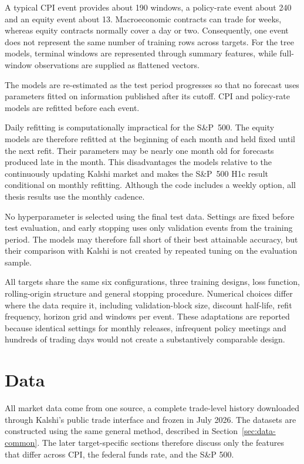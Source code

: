 \documentclass[12pt,a4paper]{report}
\begin{document}
A typical CPI event provides about 190 windows, a policy-rate event about 240
and an equity event about 13. Macroeconomic contracts can trade for weeks,
whereas equity contracts normally cover a day or two. Consequently, one event
does not represent the same number of training rows across targets. For the
tree models, terminal windows are represented through summary features, while
full-window observations are supplied as flattened vectors.

The models are re-estimated as the test period progresses so that no forecast
uses parameters fitted on information published after its cutoff. CPI and
policy-rate models are refitted before each event.

Daily refitting is computationally impractical for the S\&P~500. The equity
models are therefore refitted at the beginning of each month and held fixed
until the next refit. Their parameters may be nearly one month old for forecasts
produced late in the month. This disadvantages the models relative to the
continuously updating Kalshi market and makes the S\&P~500 H1c result
conditional on monthly refitting. Although the code includes a weekly option,
all thesis results use the monthly cadence.

No hyperparameter is selected using the final test data. Settings are fixed
before test evaluation, and early stopping uses only validation events from the
training period. The models may therefore fall short of their best attainable
accuracy, but their comparison with Kalshi is not created by repeated tuning on
the evaluation sample.

All targets share the same six configurations, three training designs, loss
function, rolling-origin structure and general stopping procedure. Numerical
choices differ where the data require it, including validation-block size,
discount half-life, refit frequency, horizon grid and windows per event. These
adaptations are reported because identical settings for monthly releases,
infrequent policy meetings and hundreds of trading days would not create a
substantively comparable design.

\chapter{Data}
\label{ch:data}

All market data come from one source, a complete trade-level history
downloaded through Kalshi's public trade interface and frozen in July 2026. The datasets are constructed using the same general method, described in Section~\ref{sec:data-common}. The later target-specific sections therefore discuss only the features that differ across CPI, the federal funds rate, and the S\&P 500.
\end{document}
